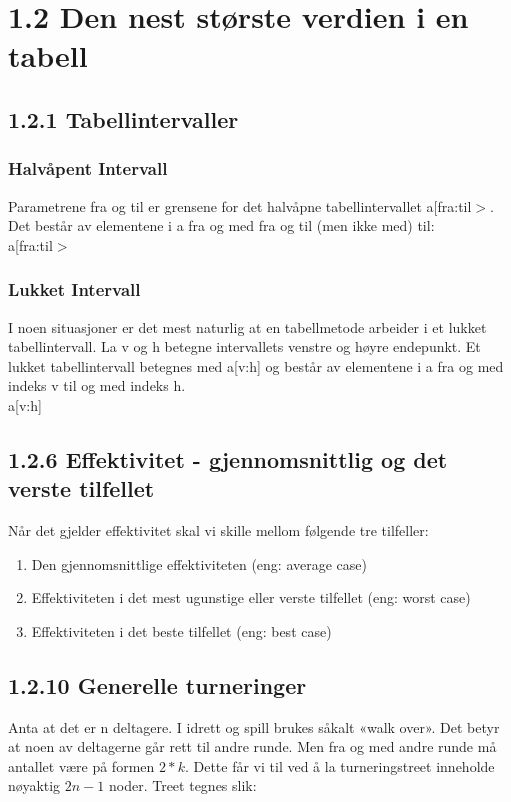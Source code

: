 \documentclass[11pt]{article}
\begin{document}
\section{1.2 Den nest største verdien i en tabell}
    \subsection{1.2.1 Tabellintervaller}

        \subsubsection{Halvåpent Intervall}
            Parametrene fra og til er grensene for det halvåpne tabellintervallet
            a[fra:til$>$. Det består av elementene i a fra og med fra og til (men ikke med) til: \\
            a[fra:til$>$

        \subsubsection{Lukket Intervall}
            I noen situasjoner er det mest naturlig at en tabellmetode arbeider i et
            lukket tabellintervall. La v og h betegne intervallets venstre og høyre endepunkt. Et lukket
            tabellintervall betegnes med a[v:h] og består av elementene i a fra og med indeks v til og
            med indeks h. \\
            a[v:h]
        
    \subsection{1.2.6 Effektivitet - gjennomsnittlig og det verste tilfellet}
        Når det gjelder effektivitet skal vi skille mellom følgende tre tilfeller: 
        \begin{enumerate}
            \item Den gjennomsnittlige effektiviteten (eng: average case)
            \item Effektiviteten i det mest ugunstige eller verste tilfellet (eng: worst case)
            \item Effektiviteten i det beste tilfellet (eng: best case)
        \end{enumerate}

    
    \subsection{1.2.10 Generelle turneringer}
        Anta at det er n deltagere. I idrett og spill brukes såkalt «walk over». Det betyr at noen av
        deltagerne går rett til andre runde. Men fra og med andre runde må antallet være på formen $2*k$. 
        Dette får vi til ved å la turneringstreet inneholde nøyaktig $2n - 1$ noder. Treet tegnes slik:
\end{document}
